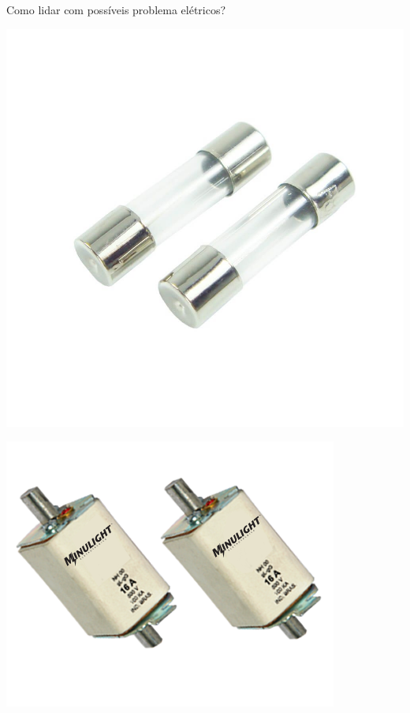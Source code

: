 \begin{frame}{Como lidar com possíveis problema elétricos?}
\begin{minipage}{0.45\linewidth}
	\centering
	\includegraphics[width=\linewidth]{Figuras/Ch05/fig10.jpg}
\end{minipage}
\hfill
\begin{minipage}{0.45\linewidth}
	\centering
	\includegraphics[width=\linewidth]{Figuras/Ch05/fig11.png}
\end{minipage}
\end{frame}

